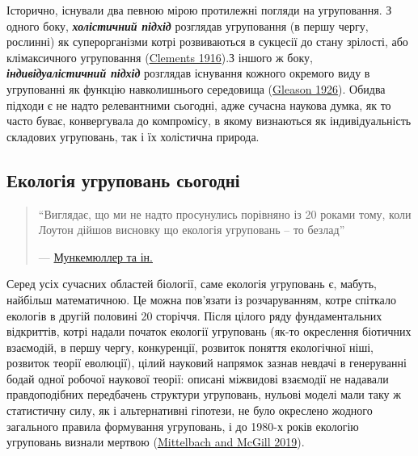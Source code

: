\documentclass[
  11pt,
]{book}
\begin{document}
Історично, існували два певною мірою протилежні погляди на угруповання. З одного боку, \textbf{\emph{холістичний підхід}} розглядав угруповання (в першу чергу, рослинні) як суперорганізми котрі розвиваються в сукцесії до стану зрілості, або клімаксичного угруповання (\href{https://scholar.google.com/scholar_lookup?title=Plant\%20Succession\%3A\%20Analysis\%20of\%20the\%20Development\%20of\%20Vegetation&author=\%20&publication_year=1916&book=Plant\%20Succession\%3A\%20Analysis\%20of\%20the\%20Development\%20of\%20Vegetation}{Clements 1916}).З іншого ж боку, \textbf{\emph{індивідуалістичний підхід}} розглядав існування кожного окремого виду в угрупованні як функцію навколишнього середовища (\href{https://doi.org/10.2307/2479933}{Gleason 1926}). Обидва підходи є не надто релевантними сьогодні, адже сучасна наукова думка, як то часто буває, конвергувала до компромісу, в якому визнаються як індивідуальність складових угруповань, так і їх холістична природа.

\subsection{Екологія угруповань сьогодні}\label{comm-ecol-today}

\begin{quote}
``Виглядає, що ми не надто просунулись порівняно із 20 роками тому, коли Лоутон дійшов висновку що екологія угруповань -- то безлад''

--- \href{https://doi.org/10.1111/geb.13098}{Мункемюллер та ін.}
\end{quote}

Серед усіх сучасних областей біології, саме екологія угруповань є, мабуть, найбільш математичною. Це можна пов'язати із розчаруванням, котре спіткало екологів в другій половині 20 сторіччя. Після цілого ряду фундаментальних відкриттів, котрі надали початок екології угруповань (як-то окреслення біотичних взаємодій, в першу чергу, конкуренції, розвиток поняття екологічної ніші, розвиток теорії еволюції), цілий науковий напрямок зазнав невдачі в генеруванні бодай одної робочої наукової теорії: описані міжвидові взаємодії не надавали правдоподібних передбачень структури угруповань, нульові моделі мали таку ж статистичну силу, як і альтернативні гіпотези, не було окреслено жодного загального правила формування угруповань, і до 1980-х років екологію угруповань визнали мертвою (\href{https://doi.org/10.1093/oso/9780198835851.001.0001}{Mittelbach and McGill 2019}).
\end{document}
